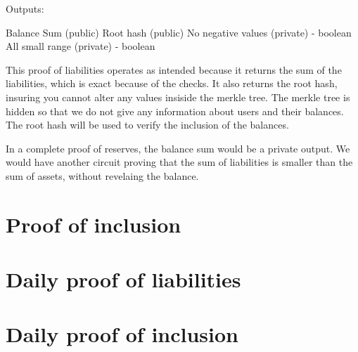Outputs:
\begin{enumerate}
    Balance Sum (public)
    Root hash (public)
    No negative values (private) - boolean
    All small range (private) - boolean
    \end{enumerate}

This proof of liabilities operates as intended because it returns the sum of the liabilities, which is exact because of the checks. 
It also returns the root hash, insuring you cannot alter any values insiside the merkle tree. The merkle tree is hidden so that we do not
give any information about users and their balances.
The root hash will be used to verify the inclusion of the balances.


In a complete proof of reserves, the balance sum would be a private output. We would have another circuit proving that the sum of liabilities is smaller
than the sum of assets, without revelaing the balance.


\section{Proof of inclusion} 


\section{Daily proof of liabilities} 

\section{Daily proof of inclusion} 





